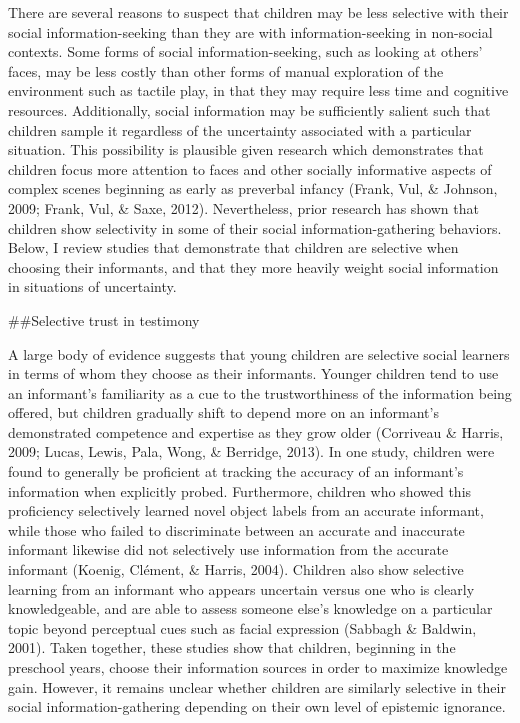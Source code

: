 \documentclass[,man,floatsintext]{apa6}
\begin{document}
There are several reasons to suspect that children may be less selective with their social information-seeking than they are with information-seeking in non-social contexts. Some forms of social information-seeking, such as looking at others' faces, may be less costly than other forms of manual exploration of the environment such as tactile play, in that they may require less time and cognitive resources. Additionally, social information may be sufficiently salient such that children sample it regardless of the uncertainty associated with a particular situation. This possibility is plausible given research which demonstrates that children focus more attention to faces and other socially informative aspects of complex scenes beginning as early as preverbal infancy (Frank, Vul, \& Johnson, 2009; Frank, Vul, \& Saxe, 2012). Nevertheless, prior research has shown that children show selectivity in some of their social information-gathering behaviors. Below, I review studies that demonstrate that children are selective when choosing their informants, and that they more heavily weight social information in situations of uncertainty.

\#\#Selective trust in testimony

A large body of evidence suggests that young children are selective social learners in terms of whom they choose as their informants. Younger children tend to use an informant's familiarity as a cue to the trustworthiness of the information being offered, but children gradually shift to depend more on an informant's demonstrated competence and expertise as they grow older (Corriveau \& Harris, 2009; Lucas, Lewis, Pala, Wong, \& Berridge, 2013). In one study, children were found to generally be proficient at tracking the accuracy of an informant's information when explicitly probed. Furthermore, children who showed this proficiency selectively learned novel object labels from an accurate informant, while those who failed to discriminate between an accurate and inaccurate informant likewise did not selectively use information from the accurate informant (Koenig, Clément, \& Harris, 2004). Children also show selective learning from an informant who appears uncertain versus one who is clearly knowledgeable, and are able to assess someone else's knowledge on a particular topic beyond perceptual cues such as facial expression (Sabbagh \& Baldwin, 2001). Taken together, these studies show that children, beginning in the preschool years, choose their information sources in order to maximize knowledge gain. However, it remains unclear whether children are similarly selective in their social information-gathering depending on their own level of epistemic ignorance.
\end{document}
